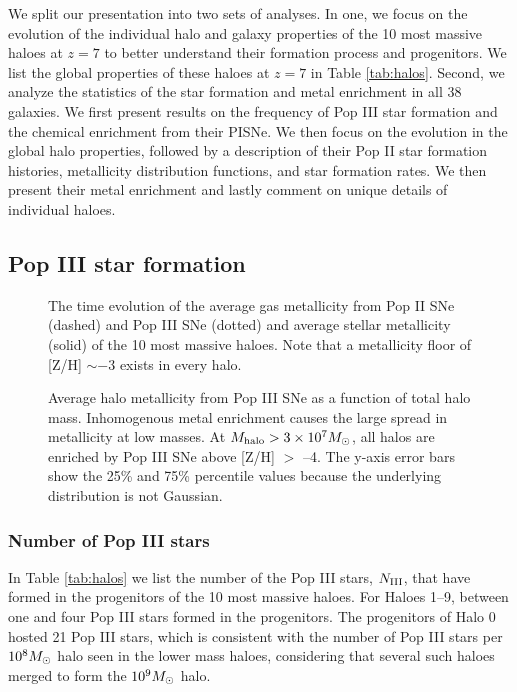 \documentclass[useAMS,usenatbib]{mn2e}
\begin{document}
We split our presentation into two sets of analyses.  In one, we focus
on the evolution of the individual halo and galaxy properties of the
10 most massive haloes at $z=7$ to better understand their formation
process and progenitors.  We list the global properties of these
haloes at $z = 7$ in Table \ref{tab:halos}.  Second, we analyze the
statistics of the star formation and metal enrichment in all 38
galaxies.  We first present results on the frequency of Pop III star
formation and the chemical enrichment from their PISNe.  We then focus
on the evolution in the global halo properties, followed by a
description of their Pop II star formation histories, metallicity
distribution functions, and star formation rates.  We then present
their metal enrichment and lastly comment on unique details of
individual haloes.

\subsection{Pop III star formation}

\begin{figure}
  \caption{\label{fig:Zevo} The time evolution of the average gas
    metallicity from Pop II SNe (dashed) and Pop III SNe (dotted) and
    average stellar metallicity (solid) of the 10 most massive haloes.
    Note that a metallicity floor of [Z/H] $\sim -3$ exists in every
    halo.}
\end{figure}

\begin{figure}
  \caption{\label{fig:zhalo3} Average halo metallicity from Pop III
    SNe as a function of total halo mass.  Inhomogenous metal
    enrichment causes the large spread in metallicity at low masses.
    At $M_{\rm halo} > 3 \times 10^7 \Ms$, all halos are enriched by
    Pop III SNe above [Z/H] $>$ --4.  The y-axis error bars show the
    25\% and 75\% percentile values because the underlying
    distribution is not Gaussian.}
\end{figure}

\subsubsection{Number of Pop III stars}

In Table \ref{tab:halos} we list the number of the Pop III stars,
$N_{\rm III}$, that have formed in the progenitors of the 10 most
massive haloes.  For Haloes 1--9, between one and four Pop III stars
formed in the progenitors.  The progenitors of Halo 0 hosted 21 Pop
III stars, which is consistent with the number of Pop III stars per
$10^8 \Ms$ halo seen in the lower mass haloes, considering that
several such haloes merged to form the $10^9 \Ms$ halo.
\end{document}
